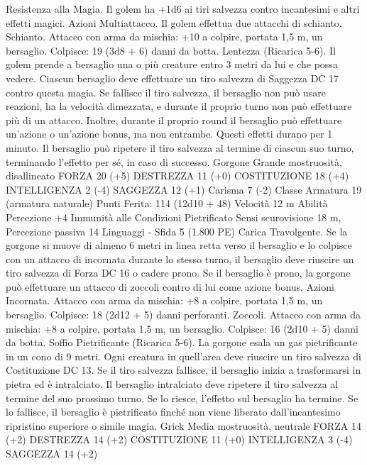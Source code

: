 \begin{multicols}{2}
Resistenza alla Magia. Il golem ha +1d6 ai tiri salvezza
contro incantesimi e altri effetti magici.
Azioni
Multiattacco. Il golem effettua due attacchi di schianto.
Schianto. Attacco con arma da mischia: +10 a colpire, portata
1,5 m, un bersaglio.
Colpisce: 19 (3d8 + 6) danni da botta.
Lentezza (Ricarica 5-6). Il golem prende a bersaglio una o più
creature entro 3 metri da lui e che possa vedere. Ciascun
bersaglio deve effettuare un tiro salvezza di Saggezza DC 17
contro questa magia. Se fallisce il tiro salvezza, il bersaglio non
può usare reazioni, ha la velocità dimezzata, e durante il proprio
turno non può effettuare più di un attacco. Inoltre, durante il
proprio round il bersaglio può effettuare un’azione o un’azione
bonus, ma non entrambe. Questi effetti durano per 1 minuto. Il
bersaglio può ripetere il tiro salvezza al termine di ciascun suo
turno, terminando l’effetto per sé, in caso di successo.
Gorgone
Grande mostruosità, disallineato
FORZA 20 (+5)
DESTREZZA 11 (+0)
COSTITUZIONE 18 (+4)
INTELLIGENZA 2 (-4)
SAGGEZZA 12 (+1)
Carisma 7 (-2)
Classe Armatura 19 (armatura naturale)
\hspace*{0pt}\hfill{Punti Ferita}: 114 (12d10 + 48)
Velocità 12 m
Abilità Percezione +4
Immunità alle Condizioni Pietrificato
Sensi scurovisione 18 m, Percezione passiva 14
Linguaggi -
Sfida 5 (1.800 PE)
Carica Travolgente. Se la gorgone si muove di almeno 6 metri in
linea retta verso il bersaglio e lo colpisce con un attacco di incornata
durante lo stesso turno, il bersaglio deve riuscire un tiro salvezza di
Forza DC 16 o cadere prono. Se il bersaglio è prono, la gorgone può
effettuare un attacco di zoccoli contro di lui come azione bonus.
Azioni
Incornata. Attacco con arma da mischia: +8 a colpire, portata
1,5 m, un bersaglio.
Colpisce: 18 (2d12 + 5) danni perforanti.
Zoccoli. Attacco con arma da mischia: +8 a colpire, portata 1,5
m, un bersaglio.
Colpisce: 16 (2d10 + 5) danni da botta.
Soffio Pietrificante (Ricarica 5-6). La gorgone esala un gas
pietrificante in un cono di 9 metri. Ogni creatura in quell’area
deve riuscire un tiro salvezza di Costituzione DC 13. Se il tiro
salvezza fallisce, il bersaglio inizia a trasformarsi in pietra ed è
intralciato. Il bersaglio intralciato deve ripetere il tiro salvezza al
termine del suo prossimo turno. Se lo riesce, l’effetto sul
bersaglio ha termine. Se lo fallisce, il bersaglio è pietrificato
finché non viene liberato dall’incantesimo ripristino superiore o
simile magia.
Grick
Media mostruosità, neutrale
FORZA 14 (+2)
DESTREZZA 14 (+2)
COSTITUZIONE 11 (+0)
INTELLIGENZA 3 (-4)
SAGGEZZA 14 (+2)

\end{multicols}
